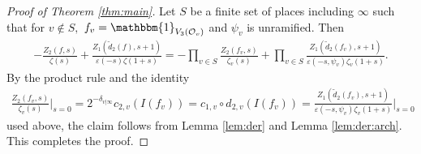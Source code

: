 \documentclass[11pt,a4paper,reqno]{amsart}
\theoremstyle{remark}
\numberwithin{equation}{section}
\theoremstyle{definition}
\numberwithin{equation}{section}
\newcommand{\one}{\mathbbm{1}}
\begin{document}
\begin{proof}[Proof of Theorem \ref{thm:main}]
Let $S$ be a finite set of places including $\infty$ such that for $v\not\in S,$ $f_v=\one_{V_3(\mathcal{O}_v)}$ and $\psi_v$ is unramified. Then
\begin{align*}
    -\frac{Z_2(f,s)}{\zeta(s)}+\frac{Z_1(\tilde{d}_2(f),s+1)}{\varepsilon(-s)\zeta(1+s)}=-\prod_{v\in S}\frac{Z_2(f_v,s)}{\zeta_v(s)}+\prod_{v\in S}\frac{Z_1(\tilde{d}_2(f_v),s+1)}{\varepsilon(-s,\psi_v)\zeta_v(1+s)}.
\end{align*}
By the product rule and the identity
\begin{align*}
   \frac{Z_2(f_v,s)}{\zeta_v(s)}\bigg|_{s=0}= 2^{-\delta_{v|\infty}}c_{2,v}(I(f_v))= c_{1,v}\circ d_{2,v}(I(f_v))=\frac{Z_1(\tilde{d}_2(f_v),s+1)}{\varepsilon(-s,\psi_v)\zeta_v(1+s)}\bigg|_{s=0}
\end{align*}
used above, the claim follows from Lemma \ref{lem:der} and Lemma \ref{lem:der:arch}. This completes the proof.
\end{proof}











{}

\end{document}
